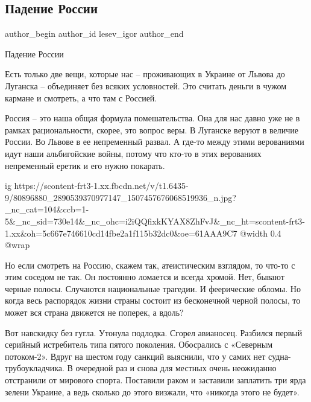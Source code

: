  
 
 
 
 
 
\subsection{Падение России}
\label{sec:26_12_2019.fb.lesev_igor.1.padenie_rossii}
 
\ifcmt
 author_begin
   author_id lesev_igor
 author_end
\fi

Падение России

Есть только две вещи, которые нас – проживающих в Украине от Львова до Луганска
– объединяет без всяких условностей. Это считать деньги в чужом кармане и
смотреть, а что там с Россией.

Россия – это наша общая формула помешательства. Она для нас давно уже не в
рамках рациональности, скорее, это вопрос веры. В Луганске веруют в величие
России. Во Львове в ее непременный развал. А где-то между этими верованиями
идут наши альбигойские войны, потому что кто-то в этих верованиях непременный
еретик и его нужно покарать.

\ifcmt
  ig https://scontent-frt3-1.xx.fbcdn.net/v/t1.6435-9/80896880_2890539370977147_1507457676068519936_n.jpg?_nc_cat=104&ccb=1-5&_nc_sid=730e14&_nc_ohc=i2iQQfixkKYAX8ZhFvJ&_nc_ht=scontent-frt3-1.xx&oh=5c667e746610cd14fbe2a1f115b32dc0&oe=61AAA9C7
  @width 0.4
  @wrap 
\fi

Но если смотреть на Россию, скажем так, атеистическим взглядом, то что-то с
этим соседом не так. Он постоянно ломается и всегда хромой. Нет, бывают черные
полосы. Случаются национальные трагедии. И феерические обломы. Но когда весь
распорядок жизни страны состоит из бесконечной черной полосы, то может вся
страна движется не поперек, а вдоль?

Вот навскидку без гугла. Утонула подлодка. Сгорел авианосец. Разбился первый
серийный истребитель типа пятого поколения. Обосрались с «Северным потоком-2».
Вдруг на шестом году санкций выяснили, что у самих нет судна-трубоукладчика. В
очередной раз и снова для местных очень неожиданно отстранили от мирового
спорта. Поставили раком и заставили заплатить три ярда зелени Украине, а ведь
сколько до этого визжали, что «никогда этого не будет».

